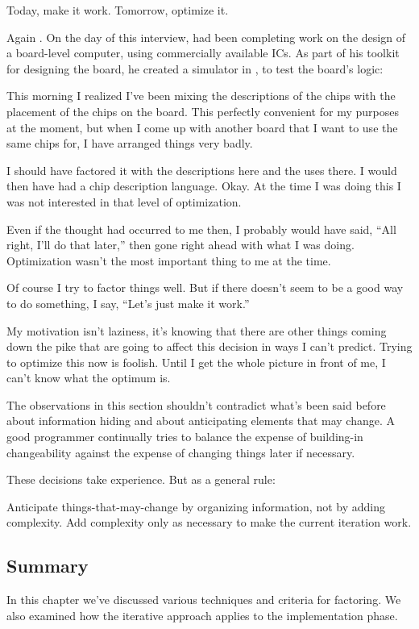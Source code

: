 \begin{tip}
Today, make it work. Tomorrow, optimize it.
\end{tip}
\begin{interview}
Again . On the day of this
interview,  had been completing work on the design of a
board-level \Forth{} computer, using commercially available ICs. As
part of his toolkit for designing the board, he created a simulator in
\Forth{}, to test the board's logic:

\begin{tfquot}
This morning I realized I've been mixing the descriptions of the chips
with the placement of the chips on the board. This perfectly
convenient for my purposes at the moment, but when I come up with
another board that I want to use the same chips for, I have arranged
things very badly.

I should have factored it with the descriptions here and the uses
there. I would then have had a chip description language. Okay. At the
time I was doing this I was not interested in that level of
optimization.

Even if the thought had occurred to me then, I probably would have
said, ``All right, I'll do that later,'' then gone right ahead with
what I was doing. Optimization wasn't the most important thing to me
at the time.

Of course I try to factor things well. But if there doesn't seem to be
a good way to do something, I say, ``Let's just make it work.''

My motivation isn't laziness, it's knowing that there are other things
coming down the pike that are going to affect this decision in ways I
can't predict. Trying to optimize this now is foolish. Until I get the
whole picture in front of me, I can't know what the optimum is.
\end{tfquot}
\end{interview}
The observations in this section shouldn't contradict what's been said
before about information hiding and about anticipating elements that
may change. A good programmer continually tries to balance the expense
of building-in changeability against the expense of changing things
later if necessary.

These decisions take experience. But as a general rule:

\begin{tip}
Anticipate things-that-may-change by organizing information, not by
adding complexity. Add complexity only as necessary to make the
current iteration work.
\end{tip}

\subsection{Summary}
In this chapter we've discussed various techniques and criteria for
factoring. We also examined how the iterative approach applies to the
implementation phase.

